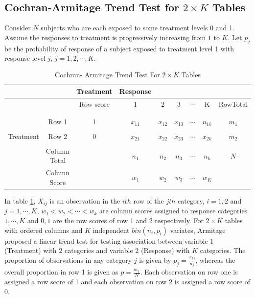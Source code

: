 \documentclass[12pt,oneside]{report}
\theoremstyle{definition}
\theoremstyle{mystyle}
\begin{document}
\subsection{Cochran-Armitage Trend Test for $2\times K$ Tables}
Consider $N$ subjects who are each exposed to some treatment  levels 0 and 1. Assume the responses to treatment is progressively increasing from $1$ to $K$. Let $p_{j}$ be the probability of response of a subject exposed to treatment level 1 with response level $j$, $j=1,2,\cdots,K$.
\begin{table}[h!]
	\begin{center}
		\caption{Cochran- Armitage Trend Test For $2\times K$ Tables}
		\begin{tabular}{c c c|c c c c c c}
			\hline
		&	&Treatment &Response   &  & &&& \\
			[0.5ex]
			\hline
		&	&Row score & 1& 2 &3&$\cdots$&K&RowTotal \\
			[0.5ex]
			\hline
		&	&&&&&&&\\
		&	&&&&&&&\\
		&	Row	1&1&$ x_{11}$& $x_{12}$ &$x_{13}$& $\cdots$ &$n_{1k}$&$m_{1}$ \\
		&	&&&&&&&\\
	Treatment	&	Row 2	&0 &$x_{21}$ & $ x_{22}$ & $ x_{23}$  & $\cdots$  &$x_{2k}$& $m_{2}$ \\
			
		&	&&&&&&&\\
		&	Column Total	& & $n_{1}$ & $n_{2}$ &$n_{3}$& $\cdots$  & $n_{k}$&$N$ \\ [1ex]
		&	Column Score	& & $w_{1}$ & $w_{2}$ &$w_{3}$& $\cdots$  & $w_{K}$& \\ [1ex]
			\hline
		\end{tabular}
		\label{table:ca}
	\end{center}
\end{table}
In table \ref{table:ca}, $X_{ij}$ is an observation in the $ith$ row of the $jth$ category, $i=1,2$ and $j=1,\cdots,K$, $w_{1}<w_{2}<\cdots<w_{k}$ are column scores assigned to response  categories $1,\cdots,K$ and $0,1$ are the row scores of row 1 and 2 respectively. For $2 \times K$ tables with ordered columns and $K$ independent $bin(n_{i},p_{i})$ variates, Armitage \cite{armitage} proposed a linear trend test for testing association between  variable 1 (Treatment) with $2$ categories and variable 2 (Response) with $K$ categories. The proportion of observations in any category $j$ is given by $p_{j}=\frac{x_{1j}}{n_{j}}$, whereas the overall proportion in row 1 is given as $p=\frac{m_{1}}{N}$. Each observation on  row one  is assigned a row score of 1 and each observation on row 2 is assigned a row score of 0.\\
\end{document}
